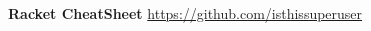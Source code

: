 \documentclass{article}
\begin{document}
\begin{landscape}
\textbf{Racket CheatSheet}
\href{https://github.com/isthissuperuser}{https://github.com/isthissuperuser}
\begin{multicols}{4}

\end{multicols}
\end{landscape}
\end{document}
